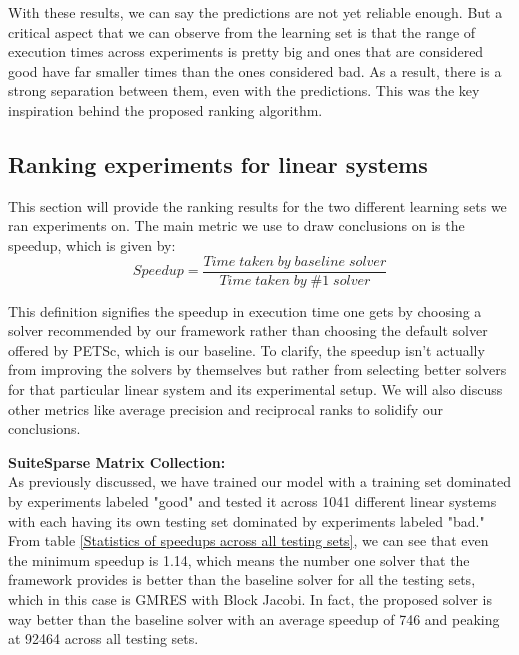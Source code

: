 With these results, we can say the predictions are not yet reliable enough. But a critical aspect that we can observe from the learning set is that the range of execution times across experiments is pretty big and ones that are considered good have far smaller times than the ones considered bad. As a result, there is a strong separation between them, even with the predictions. This was the key inspiration behind the proposed ranking algorithm. 

\subsection{Ranking experiments for linear systems}
This section will provide the ranking results for the two different learning sets we ran experiments on. The main metric we use to draw conclusions on is the speedup, which is given by:
\[
Speedup=  \frac{Time\;taken\;by\;baseline\;solver}{Time\;taken\;by\;\#1\;solver}
\]


This definition signifies the speedup in execution time one gets by choosing a solver recommended by our framework rather than choosing the default solver offered by PETSc, which is our baseline. To clarify, the speedup isn't actually from improving the solvers by themselves but rather from selecting better solvers for that particular linear system and its experimental setup. We will also discuss other metrics like average precision and reciprocal ranks to solidify our conclusions. 

\textbf{SuiteSparse Matrix Collection:}\\

As previously discussed, we have trained our model with a training set dominated by experiments labeled "good" and tested it across 1041 different linear systems with each having its own testing set dominated by experiments labeled "bad." From table \ref{Statistics of speedups across all testing sets}, we can see that even the minimum speedup is 1.14, which means the number one solver that the framework provides is better than the baseline solver for all the testing sets, which in this case is GMRES with Block Jacobi. In fact, the proposed solver is way better than the baseline solver with an average speedup of 746 and peaking at 92464 across all testing sets. 

